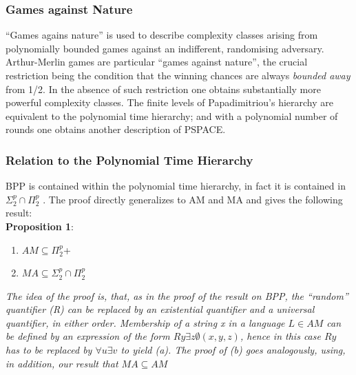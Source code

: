 \documentclass{beamer}
\begin{document}

\begin{frame}
\frametitle{Games against Nature}
``Games agains nature'' is used to describe complexity classes arising from polynomially bounded games against an indifferent, randomising adversary. Arthur-Merlin games are particular ``games against nature'', the crucial restriction being the condition that the winning chances are always \textit{bounded away} from 1/2. In the absence of such restriction one obtains substantially more powerful complexity classes. The finite levels of Papadimitriou’s hierarchy are equivalent to the polynomial time hierarchy; and with a polynomial number of rounds one obtains another description of PSPACE.
\end{frame}

\begin{frame}
\frametitle{Relation to the Polynomial Time Hierarchy}
BPP is contained within the polynomial time hierarchy, in fact it is contained in $\Sigma_2^p \cap \Pi_2^p$ . The proof directly generalizes to AM and MA and gives the following result:\\
\textbf{Proposition 1}:\begin{enumerate}
\item $AM \subseteq \Pi_2^p$+
\item   $MA \subseteq \Sigma_2^p \cap \Pi_2^p$
\end{enumerate}
\textit{ The idea of the proof is, that, as in the proof of the result on BPP, the ``random” quantifier (R) can be replaced by an existential quantifier and a universal quantifier, in either order. Membership of a string x in a language $L \in AM$ can be defined by an expression of the form $Ry \exists z \emptyset (x, y, z)$, hence in this case $Ry$ has to be replaced by $\forall u \exists v$ to yield (a). The proof of (b) goes analogously, using, in addition, our result that $MA \subseteq AM$}
\end{frame}
\end{document}
